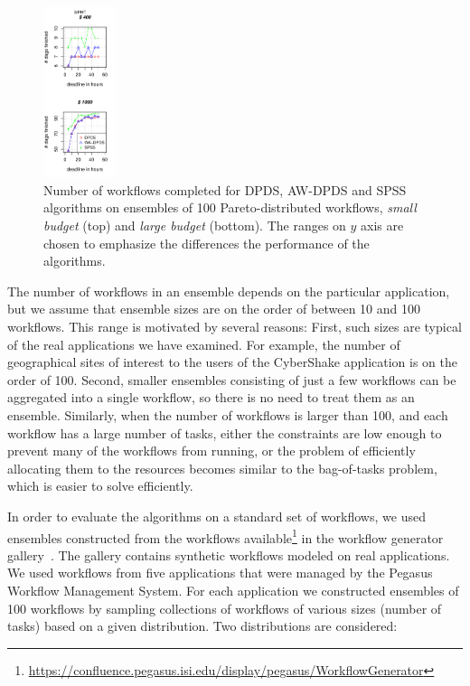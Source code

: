 \documentclass{sig-alternate}
\begin{document}
\begin{figure}[t]
\includegraphics[width=0.19\textwidth]{figures/pareto-SIPHT-n-1000-8-dagh5-50m0.pdf}
\caption{Number of workflows completed for DPDS, AW-DPDS and SPSS
algorithms on ensembles of 100 Pareto-distributed workflows, {\em small budget}
(top) and {\em large budget} (bottom). The ranges on $y$ axis are chosen to 
emphasize the differences the performance of the algorithms.}
\label{fig:number-complete-pareto}
\end{figure}


The number of workflows in an ensemble depends on the particular application, but
we assume that ensemble sizes are on the order of between 10 and 100 workflows.
This range is motivated by several reasons: First, such sizes are typical of the
real applications we have examined. For example, the number of geographical 
sites of interest to the users of the CyberShake application is on the order 
of 100. Second, smaller ensembles consisting of just a few workflows can be 
aggregated into a single workflow, so there is no need to treat them as an
ensemble. Similarly, when the number of workflows is larger than 100, and each 
workflow has a large number of tasks, either the constraints are low enough to
prevent many of the workflows from running, or the problem of efficiently 
allocating them to the resources becomes similar to the bag-of-tasks problem, 
which is easier to solve efficiently.




In order to evaluate the algorithms on a standard set of workflows, we used
ensembles constructed from the workflows available\footnote{\url{https://confluence.pegasus.isi.edu/display/pegasus/WorkflowGenerator}}
in the workflow generator gallery~\cite{Bharathi08}. The gallery contains synthetic
workflows modeled on real applications. We used workflows from five applications 
that were managed by the Pegasus Workflow Management System. For each
application we constructed ensembles of 100 workflows by sampling collections of
workflows of various sizes (number of tasks) based on a given distribution.
Two distributions are considered:
\end{document}
